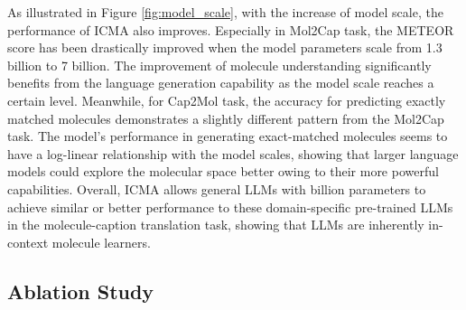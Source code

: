 As illustrated in Figure \ref{fig:model_scale}, with the increase of model scale, the performance of ICMA also improves. Especially in Mol2Cap task, the METEOR score has been drastically improved when the model parameters scale from 1.3 billion to 7 billion. The improvement of molecule understanding significantly benefits from the language generation capability as the model scale reaches a certain level. Meanwhile, for Cap2Mol task, the accuracy for predicting exactly matched molecules demonstrates a slightly different pattern from the Mol2Cap task. The model's performance in generating exact-matched molecules seems to have a log-linear relationship with the model scales, showing that larger language models could explore the molecular space better owing to their more powerful capabilities. 
Overall, ICMA allows general LLMs with billion parameters to achieve similar or better performance to these domain-specific pre-trained LLMs in the molecule-caption translation task, showing that LLMs are inherently in-context molecule learners. 

\subsection{Ablation Study}
\begin{table}[htbp]
    \centering
    \vskip -0.2in
    \vskip -0.1in
    \caption{Ablating components of Post-retrieval Re-ranking for Mol2Cap task (\textbf{Best}, \underline{Second Best}). The backbone is ICMA(Galactica-125M)$_{2,1024}$.}
    \vskip -0.2in
    \label{tab:m2c_ablation}
\end{table}

